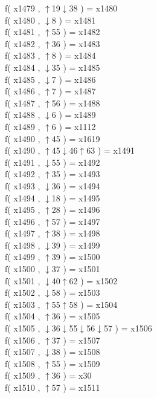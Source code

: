 f( x1479 , $\uparrow$19$\downarrow$38 ) = x1480 \\
f( x1480 , $\downarrow$8 ) = x1481 \\
f( x1481 , $\uparrow$55 ) = x1482 \\
f( x1482 , $\uparrow$36 ) = x1483 \\
f( x1483 , $\uparrow$8 ) = x1484 \\
f( x1484 , $\downarrow$35 ) = x1485 \\
f( x1485 , $\downarrow$7 ) = x1486 \\
f( x1486 , $\uparrow$7 ) = x1487 \\
f( x1487 , $\uparrow$56 ) = x1488 \\
f( x1488 , $\downarrow$6 ) = x1489 \\
f( x1489 , $\uparrow$6 ) = x1112 \\
f( x1490 , $\uparrow$45 ) = x1619 \\
f( x1490 , $\uparrow$45$\downarrow$46$\uparrow$63 ) = x1491 \\
f( x1491 , $\downarrow$55 ) = x1492 \\
f( x1492 , $\uparrow$35 ) = x1493 \\
f( x1493 , $\downarrow$36 ) = x1494 \\
f( x1494 , $\downarrow$18 ) = x1495 \\
f( x1495 , $\uparrow$28 ) = x1496 \\
f( x1496 , $\uparrow$57 ) = x1497 \\
f( x1497 , $\uparrow$38 ) = x1498 \\
f( x1498 , $\downarrow$39 ) = x1499 \\
f( x1499 , $\uparrow$39 ) = x1500 \\
f( x1500 , $\downarrow$37 ) = x1501 \\
f( x1501 , $\downarrow$40$\uparrow$62 ) = x1502 \\
f( x1502 , $\downarrow$58 ) = x1503 \\
f( x1503 , $\uparrow$55$\uparrow$58 ) = x1504 \\
f( x1504 , $\uparrow$36 ) = x1505 \\
f( x1505 , $\downarrow$36$\downarrow$55$\downarrow$56$\downarrow$57 ) = x1506 \\
f( x1506 , $\uparrow$37 ) = x1507 \\
f( x1507 , $\downarrow$38 ) = x1508 \\
f( x1508 , $\uparrow$55 ) = x1509 \\
f( x1509 , $\uparrow$36 ) = x30 \\
f( x1510 , $\uparrow$57 ) = x1511 \\
